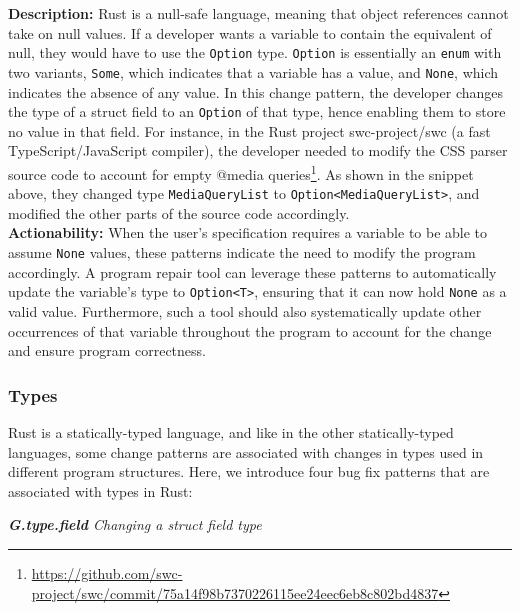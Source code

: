\noindent\textbf{Description:} Rust is a null-safe language, meaning that object references cannot take on null values. If a developer wants a variable to contain the equivalent of null, they would have to use the \texttt{Option} type. \texttt{Option} is essentially an \texttt{enum} with two variants, \texttt{Some}, which indicates that a variable has a value, and \texttt{None}, which indicates the absence of any value. In this change pattern, the developer changes the type of a struct field to an \texttt{Option} of that type, hence enabling them to store no value in that field. 
For instance, in the Rust project swc-project/swc (a fast TypeScript/JavaScript compiler), the developer needed to modify the CSS parser source code to account for empty @media queries\footnote{\scriptsize \url{https://github.com/swc-project/swc/commit/75a14f98b7370226115ee24eec6eb8c802bd4837}}. As shown in the snippet above, they changed type \texttt{MediaQueryList} to \verb+Option<MediaQueryList>+, and modified the other parts of the source code accordingly. \\

\noindent\textbf{Actionability:} When the user's specification requires a variable to be able to assume \texttt{None} values, these patterns indicate the need to modify the program accordingly. A program repair tool can leverage these patterns to automatically update the variable's type to \texttt{Option<T>}, ensuring that it can now hold \texttt{None} as a valid value. Furthermore, such a tool should also systematically update other occurrences of that variable throughout the program to account for the change and ensure program correctness. 

\subsubsection{Types}

Rust is a statically-typed language, and like in the other statically-typed languages, some change patterns are associated with changes in types used in different program structures. Here, we introduce four bug fix patterns that are associated with types in Rust:

\vspace{3mm}

\noindent\textit{\label{sec:G.type.field}\textbf{G.type.field} Changing a struct field type}

